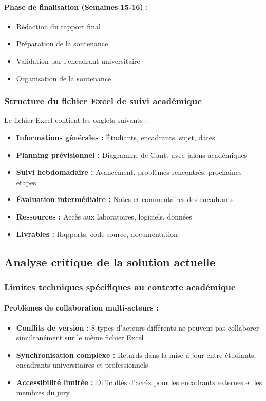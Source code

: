 \paragraph{Phase de finalisation (Semaines 15-16) :}
\begin{itemize}
    \item Rédaction du rapport final
    \item Préparation de la soutenance
    \item Validation par l'encadrant universitaire
    \item Organisation de la soutenance
\end{itemize}

\subsubsection{Structure du fichier Excel de suivi académique}
Le fichier Excel contient les onglets suivants :
\begin{itemize}
    \item \textbf{Informations générales :} Étudiants, encadrants, sujet, dates
    \item \textbf{Planning prévisionnel :} Diagramme de Gantt avec jalons académiques
    \item \textbf{Suivi hebdomadaire :} Avancement, problèmes rencontrés, prochaines étapes
    \item \textbf{Évaluation intermédiaire :} Notes et commentaires des encadrants
    \item \textbf{Ressources :} Accès aux laboratoires, logiciels, données
    \item \textbf{Livrables :} Rapports, code source, documentation
\end{itemize}

\subsection{Analyse critique de la solution actuelle}

\subsubsection{Limites techniques spécifiques au contexte académique}

\paragraph{Problèmes de collaboration multi-acteurs :}
\begin{itemize}
    \item \textbf{Conflits de version :} 8 types d'acteurs différents ne peuvent pas collaborer simultanément sur le même fichier Excel
    \item \textbf{Synchronisation complexe :} Retards dans la mise à jour entre étudiants, encadrants universitaires et professionnels
    \item \textbf{Accessibilité limitée :} Difficultés d'accès pour les encadrants externes et les membres du jury
\end{itemize}


